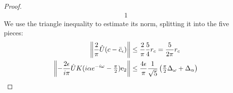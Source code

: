 \begin{proof}
\begin{alignat*}{1}
	\end{alignat*}
We use the triangle inequality to estimate its norm, splitting it into the  five pieces:
%
	\begin{alignat*}{1}
	\left\|	\frac{2}{\pi} \hat{U}  ( c - \bc_\epsilon) \right\|
	&\leq \frac{2}{\pi} \frac{5}{4} r_c 
	= \frac{5}{2 \pi}  r_c \nonumber \\
	\left\|		- \frac{2 \epsilon}{i \pi} \hat{U} K  (i  \alpha  e^{-i \omega}  -  \pp  ) \e_2  \right\|
	&\leq   \frac{4 \epsilon }{\pi} \frac{1}{\sqrt{5}} \left( \pp \dw + \da \right)  

\end{alignat*}
\end{proof}
